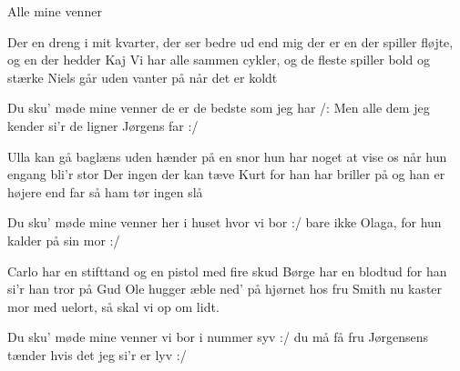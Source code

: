 \begin{sang}{Alle mine venner}
\begin{vers}
Der en dreng i mit kvarter,
der ser bedre ud end mig
der er en der spiller fløjte,
og en der hedder Kaj
Vi har alle sammen cykler,
og de fleste spiller bold
og stærke Niels går uden vanter på
når det er koldt
\end{vers}
\begin{vers}
Du sku' møde mine venner
de er de bedste som jeg har
/: Men alle dem jeg kender
si'r de ligner Jørgens far :/
\end{vers}
\begin{vers}
Ulla kan gå baglæns
uden hænder på en snor
hun har noget at vise os
når hun engang bli'r stor
Der ingen der kan tæve Kurt
for han har briller på
og han er højere end far
så ham tør ingen slå
\end{vers}
\begin{vers}
Du sku' møde mine venner
her i huset hvor vi bor
:/ bare ikke Olaga,
for hun kalder på sin mor :/
\end{vers}
\begin{vers}
Carlo har en stifttand
og en pistol med fire skud
Børge har en blodtud
for han si'r han tror på Gud
Ole hugger æble
ned' på hjørnet hos fru Smith
nu kaster mor med uelort,
så skal vi op om lidt.
\end{vers}
\begin{vers}
Du sku' møde mine venner 
vi bor i nummer syv
:/ du må få fru Jørgensens tænder
hvis det jeg si'r er lyv :/
\end{vers}
\end{sang}